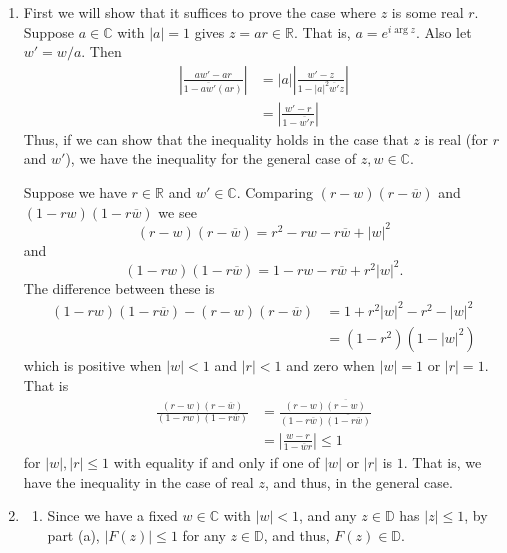 \documentclass[12 pt, letterpaper]{hmcpset}
\begin{document}
\begin{solution}
	\begin{enumerate}
		\item First we will show that it suffices to prove the case where $z$ is some real $r$. Suppose $a \in \mathbb{C}$ with $\lvert a \rvert = 1$ gives $z = ar \in \mathbb{R}$. That is, $a = e^{i \operatorname{arg} z}$. Also let $w' = w / a$. Then
			\[
				\begin{split}
					\left \lvert \frac{aw' - ar}{1 - \overline{aw'} (ar)} \right \rvert & = \lvert a \rvert \left \lvert \frac{w' - z}{1 - \lvert a \rvert^{2} \overline{w'} z} \right \rvert \\
													  & = \left \lvert \frac{w' - r}{1 - \overline{w'} r} \right \rvert
				\end{split}
			\]
			Thus, if we can show that the inequality holds in the case that $z$ is real (for $r$ and $w'$), we have the inequality for the general case of $z, w \in \mathbb{C}$. 

			Suppose we have $r \in \mathbb{R}$ and $w' \in \mathbb{C}$. Comparing $(r - w)(r - \overline{w})$ and $(1 - rw)(1 - r \overline{w})$ we see
			\[
				(r - w)(r - \overline{w}) = r^{2} - r w - r \overline{w} + \lvert w \rvert^{2}
			\]
			and
			\[
				(1 - r w)(1 - r \overline{w}) = 1 - rw - r\overline{w} + r^{2} \lvert w \rvert^{2}.
			\]
			The difference between these is
			\[
				\begin{split}
					(1 - rw)(1 - r\overline{w}) - (r - w)(r - \overline{w}) & = 1 + r^{2} \lvert w \rvert^{2} - r^{2} - \lvert w \rvert^{2} \\
												& = (1 - r^{2})(1 - \lvert w \rvert^{2})
				\end{split}	
			\]
			which is positive when $\lvert w \rvert < 1$ and $\lvert r \rvert < 1$ and zero when $\lvert w \rvert = 1$ or $\lvert r \rvert = 1$. That is
			\[
				\begin{split}
					\frac{(r - w)(r - \overline{w})}{(1 - rw)(1 - r\overline{w})} & = \frac{(r - w) \overline{(r - w)}}{(1 - r \overline{w}) \overline{(1 - r \overline{w})}} \\
												      & = \left \lvert \frac{w - r}{1 - \overline{w} r} \right \rvert \le 1
				\end{split}
			\]
			for $\lvert w \rvert, \lvert r \rvert \le 1$ with equality if and only if one of $\lvert w \rvert$ or $\lvert r \rvert$ is $1$. That is, we have the inequality in the case of real $z$, and thus, in the general case.
		\item
			\begin{enumerate}[label = (\roman*)]
				\item Since we have a fixed $w \in \mathbb{C}$ with $\lvert w \rvert < 1$, and any $z \in \mathbb{D}$ has $\lvert z \rvert \le 1$, by part (a), $\lvert F(z) \rvert \le 1$ for any $z \in \mathbb{D}$, and thus, $F(z) \in \mathbb{D}$.


\end{enumerate}
\end{enumerate}
\end{solution}
\end{document}
